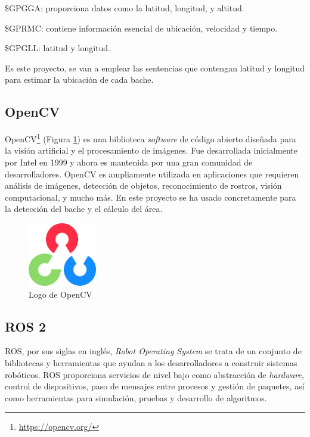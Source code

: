 \$GPGGA: proporciona datos como la latitud, longitud, y altitud.

\$GPRMC: contiene información esencial de ubicación, velocidad y tiempo.

\$GPGLL: latitud y longitud.

Es este proyecto, se van a emplear las sentencias que contengan latitud y longitud para estimar la ubicación de cada bache.

\subsection{OpenCV}
\label{subsec:opencv}

OpenCV\footnote{\url{https://opencv.org/}} (Figura \ref{fig:opencv}) es una biblioteca \textit{software} de código abierto diseñada para la visión artificial y el procesamiento de imágenes. Fue desarrollada inicialmente por Intel en 1999 y ahora es mantenida por una gran comunidad de desarrolladores. OpenCV es ampliamente utilizada en aplicaciones que requieren análisis de imágenes, detección de objetos, reconocimiento de rostros, visión computacional, y mucho más. En este proyecto se ha usado concretamente para la detección del bache y el cálculo del área.

\begin{figure} [h!]
	\begin{center}
		\includegraphics[width=3cm]{figs/opencv.png}
	\end{center}
	\caption{Logo de OpenCV} 
	\label{fig:opencv}
\end{figure}

\subsection{ROS 2}
\label{subsec:ros2}

ROS, por sus siglas en inglés, \textit{Robot Operating System} se trata de un conjunto de bibliotecas y herramientas que ayudan a los desarrolladores a construir sistemas robóticos. ROS proporciona servicios de nivel bajo como abstracción de \textit{hardware}, control de dispositivos, paso de mensajes entre procesos y gestión de paquetes, así como herramientas para simulación, pruebas y desarrollo de algoritmos.

